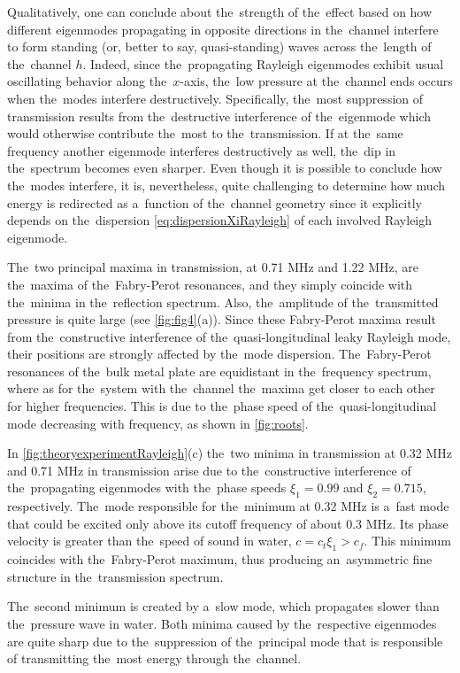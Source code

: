 Qualitatively, one can conclude about the~strength of the~effect based on how different eigenmodes propagating in opposite directions in the~channel interfere to form standing (or, better to say, quasi-standing) waves across the~length of the~channel $h$.
Indeed, since the~propagating Rayleigh eigenmodes exhibit usual oscillating behavior along the~$x$-axis, the~low pressure at the~channel ends occurs when the~modes interfere destructively.
Specifically, the~most suppression of transmission results from the~destructive interference of the~eigenmode which would otherwise contribute the~most to the~transmission.
If at the~same frequency another eigenmode interferes destructively as well, the~dip in the~spectrum becomes even sharper.
Even though it is possible to conclude how the~modes interfere, it is, nevertheless, quite challenging to determine how much energy is redirected as a~function of the~channel geometry since it explicitly depends on the~dispersion \cref{eq:dispersionXiRayleigh} of each involved Rayleigh eigenmode.

The~two principal maxima in transmission, at 0.71 MHz and 1.22 MHz, are the~maxima of the~Fabry-Perot resonances, and they simply coincide with the~minima in the~reflection spectrum.
Also, the~amplitude of the~transmitted pressure is quite large (see \cref{fig:fig4}(a)).
Since these Fabry-Perot maxima result from the~constructive interference of the~quasi-longitudinal leaky Rayleigh mode, their positions are strongly affected by the~mode dispersion.
The~Fabry-Perot resonances of the~bulk metal plate are equidistant in the~frequency spectrum, where as for the~system with the~channel the~maxima get closer to each other for higher frequencies.
This is due to the~phase speed of the~quasi-longitudinal mode decreasing with frequency, as shown in \cref{fig:roots}.

In \cref{fig:theoryexperimentRayleigh}(c) the~two minima in transmission at 0.32 MHz and 0.71 MHz in transmission arise due to the~constructive interference of the~propagating eigenmodes with the~phase speeds $\xi_1 = 0.99$ and $\xi_2 = 0.715$, respectively.
The~mode responsible for the~minimum at 0.32 MHz is a~fast mode that could be excited only above its cutoff frequency of about 0.3 MHz.
Its phase velocity is greater than the~speed of sound in water, $c=c_t\xi_1 > c_f$.
This minimum coincides with the~Fabry-Perot maximum, thus producing an~asymmetric fine structure in the~transmission spectrum.

The~second minimum is created by a~slow mode, which propagates slower than the~pressure wave in water.
Both minima caused by the~respective eigenmodes are quite sharp due to the~suppression of the~principal mode that is responsible of transmitting the~most energy through the~channel.


